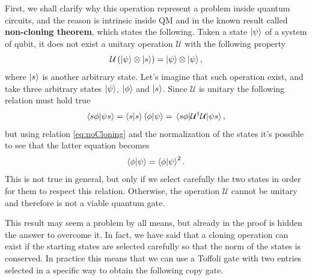 First, we shall clarify why this operation represent a problem inside quantum circuits, and the reason is intrinsic inside QM and in the known result called \textbf{non-cloning theorem}, which states the following.
{
    Taken a state $\ket{\psi}$ of a system of qubit, it does not exist a unitary operation $\mathcal{U}$ with the following property
    \begin{equation}
        \label{eq:noCloning}
        \mathcal{U}\left( \ket{\psi}\otimes \ket{s} \right) = \ket{\psi}\otimes \ket{\psi},
    \end{equation}
    where $\ket{s}$ is another arbitrary state.
}
{
    Let's imagine that such operation exist, and take three arbitrary states $\ket{\psi}$, $\ket{\phi}$ and $\ket{s}$. Since $\mathcal{U}$ is unitary the following relation must hold true
    \begin{equation}
        \braket{s\phi}{\psi s} = \braket{s}\braket{\phi}{\psi} = \mel{s\phi}{\mathcal{U}^\dagger \mathcal{U}}{\psi s},
    \end{equation}
    but using relation \eqref{eq:noCloning} and the normalization of the states it's possible to see that the latter equation becomes
    \begin{equation}
        \braket{\phi}{\psi} = \braket{\phi}{\psi}^2.
    \end{equation}
    This is not true in general, but only if we select carefully the two states in order for them to respect this relation. Otherwise, the operation $\mathcal{U}$ cannot be unitary and therefore is not a viable quantum gate.
}

This result may seem a problem by all means, but already in the proof is hidden the answer to overcome it. In fact, we have said that a cloning operation can exist if the starting states are selected carefully so that the norm of the states is conserved. In practice this means that we can use a Toffoli gate with two entries selected in a specific way to obtain the following copy gate.

